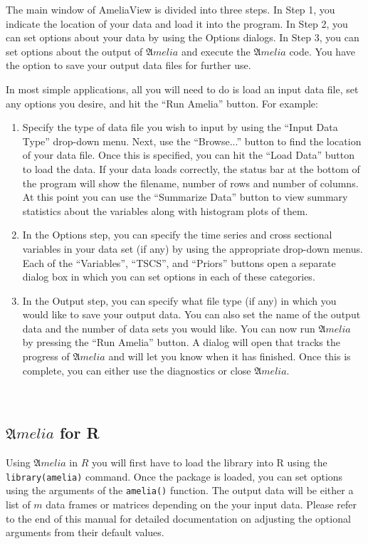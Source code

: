 \documentclass[12pt,titlepage]{article}
\newcommand{\Amelia}{\ensuremath{\mathfrak Amelia} }
\begin{document}
The main window of AmeliaView is divided into three steps.  In Step 1, you indicate the location of your data and load it into the program.  In Step 2, you can set options about your data by using the Options dialogs.  In Step 3, you can set options about the output of ${\mathfrak Amelia}$ and execute the ${\mathfrak Amelia}$ code.  You have the option to save your output data files for further use.

In most simple applications, all you will need to do is load an input data file, set any options you desire, and hit the ``Run Amelia'' button.  For example:
\begin{enumerate}
\item Specify the type of data file you wish to input by using the ``Input Data Type'' drop-down menu.  Next, use the ``Browse...'' button to find the location of your data file.  Once this is specified, you can hit the ``Load Data'' button to load the data.  If your data loads correctly, the status bar at the bottom of the program will show the filename, number of rows and number of columns.  At this point you can use the ``Summarize Data'' button to view summary statistics about the variables along with histogram plots of them.  
\item In the Options step, you can specify the time series and cross sectional variables in your data set (if any) by using the appropriate drop-down menus.  Each of the ``Variables'', ``TSCS'', and ``Priors'' buttons open a separate dialog box in which you can set options in each of these categories.
\item In the Output step, you can specify what file type (if any) in which you would like to save your output data.  You can also set the name of the output data and the number of data sets you would like.  You can now run ${\mathfrak Amelia}$ by pressing the ``Run Amelia'' button.  A dialog will open that tracks the progress of ${\mathfrak Amelia}$ and will let you know when it has finished.  Once this is complete, you can either use the diagnostics or close ${\mathfrak Amelia}$.
\end{enumerate}

\
\subsection{\Amelia for R}
\label{sec:roverview}
Using \Amelia in $R$ you will first have to load the library into R using the \texttt{library(amelia)} command.  Once the package is loaded, you can set options using the arguments of the \texttt{amelia()} function.  The output data will be either a list of $m$ data frames or matrices depending on the your input data.  Please refer to the end of this manual for detailed documentation on adjusting the optional arguments from their default values.  
\end{document}
